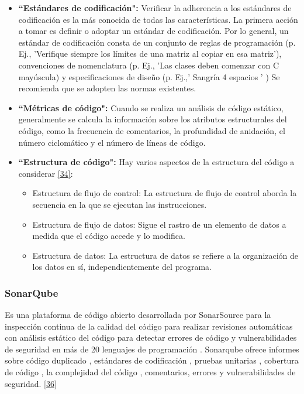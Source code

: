 \begin{itemize}
	\item \textbf {``Estándares de codificación":} Verificar la adherencia a los estándares de codificación es la más conocida de todas las características. La primera acción a tomar es definir o adoptar un estándar de codificación. Por lo general, un estándar de codificación consta de un conjunto de reglas de programación (p. Ej., 'Verifique siempre los límites de una matriz al copiar en esa matriz'), convenciones de nomenclatura (p. Ej., 'Las clases deben comenzar con C mayúscula) y especificaciones de diseño (p. Ej.,' Sangría 4 espacios ' ) Se recomienda que se adopten las normas existentes. 
	\item \textbf {``Métricas de código":} Cuando se realiza un análisis de código estático, generalmente se calcula la información sobre los atributos estructurales del código, como la frecuencia de comentarios, la profundidad de anidación, el número ciclomático y el número de líneas de código.
	\item \textbf {``Estructura de código":} 
	 Hay varios aspectos de la estructura del código a considerar \hyperlink{b34}{[34]}: 
	\begin{itemize}
		\item Estructura de flujo de control: La estructura de flujo de control aborda la secuencia en la que se ejecutan las instrucciones.
		\item Estructura de flujo de datos: Sigue el rastro de un elemento de datos a medida que el código accede y lo modifica.
		\item Estructura de datos: La estructura de datos se refiere a la organización de los datos en sí, independientemente del programa.
	\end{itemize}
\end{itemize}

\subsubsection{SonarQube }

Es una plataforma de código abierto desarrollada por SonarSource para la inspección continua de la calidad del código para realizar revisiones automáticas con análisis estático del código para detectar errores de código y vulnerabilidades de seguridad en más de 20 lenguajes de programación . Sonarqube ofrece informes sobre código duplicado , estándares de codificación , pruebas unitarias , cobertura de código , la complejidad del código , comentarios, errores y vulnerabilidades de seguridad. \hyperlink{b36}{[36]}\\

